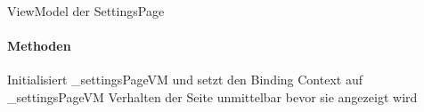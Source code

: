 \documentclass[../entwurf.tex]{subfiles}
\begin{document}
\begin{itemize}
	 ViewModel der SettingsPage
\end{itemize}

\paragraph{Methoden}

\begin{itemize}
	 Initialisiert \_settingsPageVM und setzt den Binding Context 			auf \_settingsPageVM
	 Verhalten der Seite unmittelbar bevor sie angezeigt wird
\end{itemize}
\end{document}
